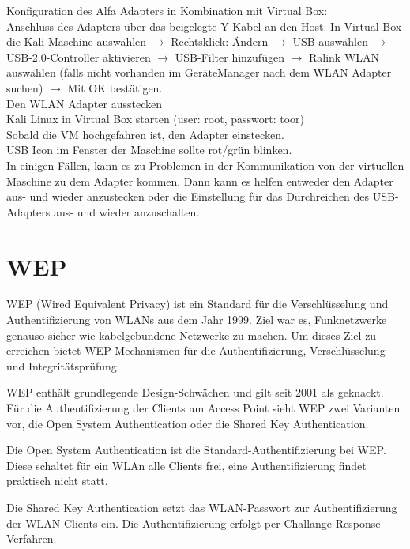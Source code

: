 Konfiguration des Alfa Adapters in Kombination mit Virtual Box:\\

Anschluss des Adapters über das beigelegte Y-Kabel an den Host.
In Virtual Box die Kali Maschine auswählen $\rightarrow$ Rechtsklick: Ändern $\rightarrow$ USB auswählen $\rightarrow$ USB-2.0-Controller aktivieren $\rightarrow$ USB-Filter hinzufügen
$\rightarrow$ Ralink WLAN auswählen (falls nicht vorhanden im GeräteManager nach dem WLAN Adapter suchen) $\rightarrow$ Mit OK bestätigen.\\
Den WLAN Adapter ausstecken\\

Kali Linux in Virtual Box starten (user: root, passwort: toor)\\
Sobald die VM hochgefahren ist, den Adapter einstecken.\\
USB Icon im Fenster der Maschine sollte rot/grün blinken.\\ %

In einigen Fällen, kann es zu Problemen in der Kommunikation von der virtuellen Maschine zu dem Adapter kommen. 
Dann kann es helfen entweder den Adapter aus- und wieder anzustecken oder die Einstellung für das Durchreichen des USB-Adapters aus- und wieder anzuschalten.


\section{WEP}
WEP (Wired Equivalent Privacy) ist ein Standard für die Verschlüsselung und Authentifizierung von WLANs aus dem Jahr 1999. Ziel war es, Funknetzwerke genauso sicher wie kabelgebundene Netzwerke zu machen. Um dieses Ziel zu erreichen bietet WEP Mechanismen für die Authentifizierung, Verschlüsselung und Integritätsprüfung. 

WEP enthält grundlegende Design-Schwächen und gilt seit 2001 als geknackt. 
Für die Authentifizierung der Clients am Access Point sieht WEP zwei Varianten vor, die Open System Authentication oder die Shared Key Authentication. 

Die Open System Authentication ist die Standard-Authentifizierung bei WEP. Diese schaltet für ein WLAn alle Clients frei, eine Authentifizierung findet praktisch nicht statt.

Die Shared Key Authentication setzt das WLAN-Passwort zur Authentifizierung der WLAN-Clients ein. Die Authentifizierung erfolgt per Challange-Response-Verfahren. 

